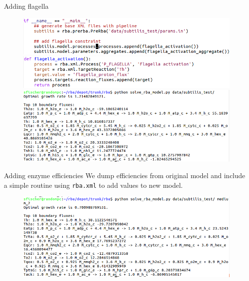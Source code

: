 \documentclass{beamer}
\begin{document}
\begin{frame}{Adding flagella}
  \begin{figure}
    \centering
    \includegraphics[width=\linewidth]{added_flagella_code_1} \\
    \includegraphics[width=\linewidth]{added_flagella_code_2} \\
    \includegraphics[width=\linewidth]{added_flagella_solver}
  \end{figure}
\end{frame}

\begin{frame}{Adding enzyme efficiencies}
  We dump efficiencies from original model and include a simple routine using
  \texttt{rba.xml} to add values to new model.
  \begin{figure}
    \centering
    \includegraphics[width=\linewidth]{added_enzyme_efficiencies}
  \end{figure}
\end{frame}
\end{document}
